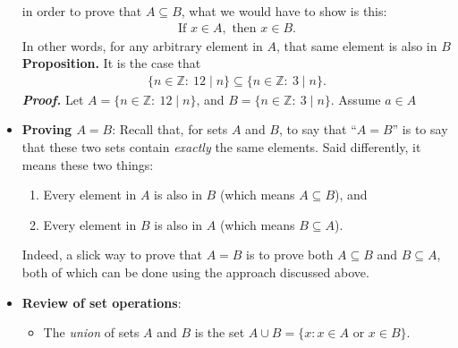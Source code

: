 \documentclass{report}
\begin{document}
\begin{itemize}
            \bigbreak \noindent 
            in order to prove that $A \subseteq B$, what we would have to show is this:
            \begin{align*}
                \text{If } x\in A, \text{ then } x\in B 
            .\end{align*}
            In other words, for any arbitrary element in $A$, that same element is also in $B$
            \bigbreak \noindent 
            \textbf{Proposition.} It is the case that 
            \begin{align*}
                \{n \in \mathbb{Z}:\ 12 \mid n\} \subseteq \{n\in\mathbb{Z}:\ 3\mid n\}
            .\end{align*}
            \bigbreak \noindent 
            \textbf{\textit{Proof.}} Let $A = \{n\in\mathbb{Z}:\ 12\mid n\} $, and $B =\{n\in\mathbb{Z}:\ 3\mid n\} $. Assume $a\in A$
        \item \textbf{Proving $A = B$}:
            Recall that, for sets $A$ and $B$, to say that ``$A = B$'' is to say that these two sets contain \textit{exactly} the same elements. Said differently, it means these two things:
            \begin{enumerate}
                \item Every element in $A$ is also in $B$ (which means $A \subseteq B$), and
                \item Every element in $B$ is also in $A$ (which means $B \subseteq A$).
            \end{enumerate}
            Indeed, a slick way to prove that $A = B$ is to prove both $A \subseteq B$ and $B \subseteq A$, both of which can be done using the approach discussed above.
        \item \textbf{Review of set operations}:
            \begin{itemize}
                \item The \textit{union} of sets $A$ and $B$ is the set $A \cup B = \{x : x \in A \text{ or } x \in B\}$.

\end{itemize}
\end{itemize}
\end{document}
